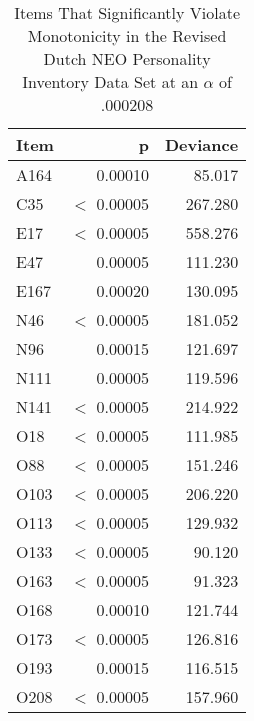 \begin{table}[ht]
\centering
\caption{Items That Significantly Violate Monotonicity in the Revised Dutch NEO Personality Inventory Data Set at an $\alpha$ of .000208} 
\label{tab:neo_pi_r_dolan2}
\begin{tabular}{lrr}
  \toprule
Item & p & Deviance \\ 
  \midrule
A164 & 0.00010 & 85.017 \\ 
  C35 & $<$ 0.00005 & 267.280 \\ 
  E17 & $<$ 0.00005 & 558.276 \\ 
  E47 & 0.00005 & 111.230 \\ 
  E167 & 0.00020 & 130.095 \\ 
  N46 & $<$ 0.00005 & 181.052 \\ 
  N96 & 0.00015 & 121.697 \\ 
  N111 & 0.00005 & 119.596 \\ 
  N141 & $<$ 0.00005 & 214.922 \\ 
  O18 & $<$ 0.00005 & 111.985 \\ 
  O88 & $<$ 0.00005 & 151.246 \\ 
  O103 & $<$ 0.00005 & 206.220 \\ 
  O113 & $<$ 0.00005 & 129.932 \\ 
  O133 & $<$ 0.00005 & 90.120 \\ 
  O163 & $<$ 0.00005 & 91.323 \\ 
  O168 & 0.00010 & 121.744 \\ 
  O173 & $<$ 0.00005 & 126.816 \\ 
  O193 & 0.00015 & 116.515 \\ 
  O208 & $<$ 0.00005 & 157.960 \\ 
   \bottomrule
\end{tabular}
\end{table}
